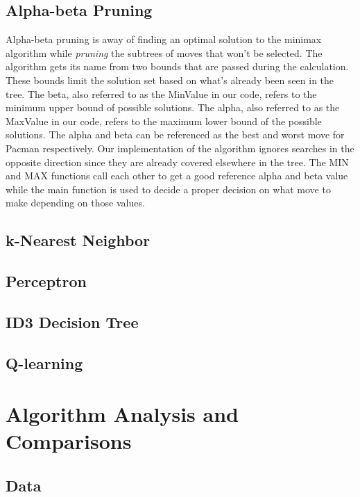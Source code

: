 \documentclass[a4paper,oneside,10pt]{report}
\begin{document}
\section{Alpha-beta Pruning}\label{alphabeta}
Alpha-beta pruning is away of finding an optimal solution to the minimax algorithm while \textit{pruning} the subtrees of moves that won't be selected. The algorithm gets its name from two bounds that are passed during the calculation. These bounds limit the solution set based on what's already been seen in the tree. The beta, also referred to as the MinValue in our code, refers to the minimum upper bound of possible solutions. The alpha, also referred to as the MaxValue in our code, refers to the maximum lower bound of the possible solutions. The alpha and beta can be referenced as the best and worst move for Pacman respectively. Our implementation of the algorithm ignores searches in the opposite direction since they are already covered elsewhere in the tree. The MIN and MAX functions call each other to get a good reference alpha and beta value while the main function is used to decide a proper decision on what move to make depending on those values.

\section{k-Nearest Neighbor}\label{knn}

\section{Perceptron}\label{perceptron}

\section{ID3 Decision Tree}\label{id3}

\section{Q-learning}\label{qlearn}

\chapter{Algorithm Analysis and Comparisons} \label{comparison}

\section {Data} \label{compData}
\end{document}
